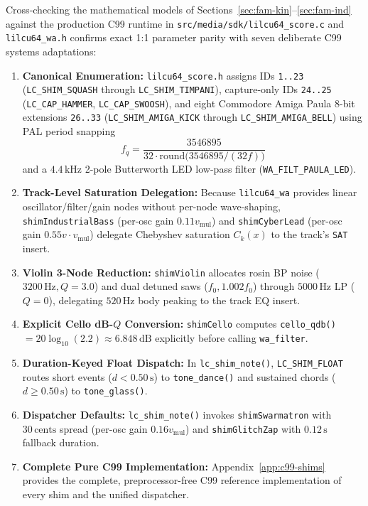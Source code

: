 Cross-checking the mathematical models of Sections~\ref{sec:fam-kin}--\ref{sec:fam-ind} against the production C99 runtime in \texttt{src/media/sdk/lilcu64\_score.c} and \texttt{lilcu64\_wa.h} confirms exact 1:1 parameter parity with seven deliberate C99 systems adaptations:
\begin{enumerate}[leftmargin=1.5em]
  \item \textbf{Canonical Enumeration:} \texttt{lilcu64\_score.h} assigns IDs \texttt{1..23} (\texttt{LC\_SHIM\_SQUASH} through \texttt{LC\_SHIM\_TIMPANI}), capture-only IDs \texttt{24..25} (\texttt{LC\_CAP\_HAMMER}, \texttt{LC\_CAP\_SWOOSH}), and eight Commodore Amiga Paula 8-bit extensions \texttt{26..33} (\texttt{LC\_SHIM\_AMIGA\_KICK} through \texttt{LC\_SHIM\_AMIGA\_BELL}) using PAL period snapping
  \[
  f_q = \frac{3546895}{32 \cdot \mathrm{round}\!\big(3546895 / (32 f)\big)}
  \]
  and a $4.4\,\text{kHz}$ 2-pole Butterworth LED low-pass filter (\texttt{WA\_FILT\_PAULA\_LED}).
  \item \textbf{Track-Level Saturation Delegation:} Because \texttt{lilcu64\_wa} provides linear oscillator/filter/gain nodes without per-node wave-shaping, \texttt{shimIndustrialBass} (per-osc gain $0.11 v_{\mathrm{mul}}$) and \texttt{shimCyberLead} (per-osc gain $0.55 v\cdot v_{\mathrm{mul}}$) delegate Chebyshev saturation $C_k(x)$ to the track's \texttt{SAT} insert.
  \item \textbf{Violin 3-Node Reduction:} \texttt{shimViolin} allocates rosin BP noise ($3200\,\text{Hz}, Q=3.0$) and dual detuned saws ($f_0, 1.002f_0$) through $5000\,\text{Hz}$ LP ($Q=0$), delegating $520\,\text{Hz}$ body peaking to the track EQ insert.
  \item \textbf{Explicit Cello dB-$Q$ Conversion:} \texttt{shimCello} computes \texttt{cello\_qdb()} $= 20\log_{10}(2.2) \approx 6.848\,\text{dB}$ explicitly before calling \texttt{wa\_filter}.
  \item \textbf{Duration-Keyed Float Dispatch:} In \texttt{lc\_shim\_note()}, \texttt{LC\_SHIM\_FLOAT} routes short events ($d < 0.50\,\text{s}$) to \texttt{tone\_dance()} and sustained chords ($d \ge 0.50\,\text{s}$) to \texttt{tone\_glass()}.
  \item \textbf{Dispatcher Defaults:} \texttt{lc\_shim\_note()} invokes \texttt{shimSwarmatron} with $30\,\text{cents}$ spread (per-osc gain $0.16 v_{\mathrm{mul}}$) and \texttt{shimGlitchZap} with $0.12\,\text{s}$ fallback duration.
  \item \textbf{Complete Pure C99 Implementation:} Appendix~\ref{app:c99-shims} provides the complete, preprocessor-free C99 reference implementation of every shim and the unified dispatcher.
\end{enumerate}

